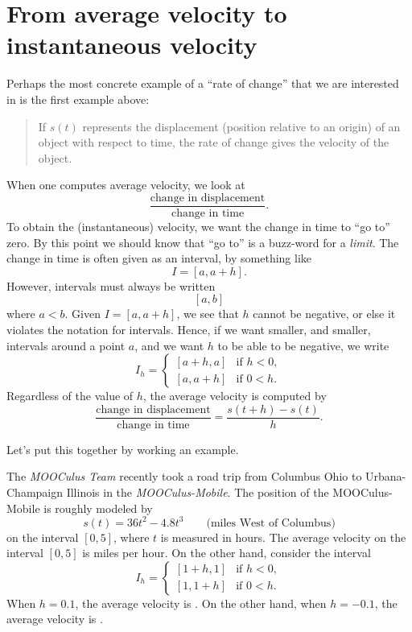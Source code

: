 \documentclass{ximera}
\begin{document}
\section{From average velocity to instantaneous velocity}


Perhaps the most concrete example of a ``rate of change'' that we are
interested in is the first example above:
\begin{quote}
  If $s(t)$ represents the displacement (position relative to an origin)
  of an object with respect to time, the rate of change gives the
  velocity of the object.
\end{quote}
When one computes average velocity, we look at 
\[
\frac{\text{change in displacement}}{\text{change in time}}.
\]
To obtain the (instantaneous) velocity, we want the change in time to
``go to'' zero. By this point we should know that ``go to'' is a
buzz-word for a \textit{limit}. The change in time is often given as
an interval, by something like
\[
I = [a, a+h].
\]
However, intervals must always be written 
\[
[a,b]
\]
where $a < b$. Given $I = [a, a+h]$, we see that $h$ cannot be
negative, or else it violates the notation for intervals. Hence, if we
want smaller, and smaller, intervals around a point $a$, and we want
$h$ to be able to be negative, we write
\[
I_h = 
\begin{cases}
  [a+h,a]  & \text{if $h<0$}, \\ %
  [a,a+h]  & \text{if $0<h$}.     %
\end{cases}
\]
Regardless of the value of $h$, the average velocity is computed by
\[
\frac{\text{change in displacement}}{\text{change in time}} =
\frac{s(t+h)-s(t)}{h}.
\]

Let's put this together by working an example.

\begin{example}
The \textit{MOOCulus Team} recently took a road trip from Columbus
Ohio to Urbana-Champaign Illinois in the \textit{MOOCulus-Mobile}. The
position of the MOOCulus-Mobile is roughly modeled by
\[
s(t) = 36t^2 - 4.8t^3 \qquad\text{(miles West of Columbus)} %
\]
on the interval $[0,5]$, where $t$ is measured in hours. The average
velocity on the interval $[0,5]$ is  miles per hour. On the
other hand, consider the interval
\[
I_h = 
\begin{cases}
  [1+h,1]  & \text{if $h<0$}, \\ %
  [1,1+h]  & \text{if $0<h$}.     %
\end{cases}
\]
When $h = 0.1$, the average velocity is . On the other
hand, when $h=-0.1$, the average velocity is .
\end{example}
\end{document}

